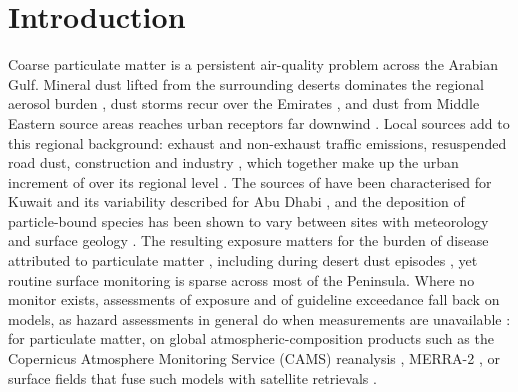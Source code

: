 \section{Introduction}
\label{sec:intro}

Coarse particulate matter is a persistent air-quality problem across the Arabian Gulf. Mineral
dust lifted from the surrounding deserts dominates the regional aerosol burden
\citep{gandham2020,shahid2026}, dust storms recur over the Emirates
\citep{barbulescu2020,karagulian2019}, and dust from Middle Eastern source areas reaches urban
receptors far downwind \citep{givehchi2013}. Local sources add to this regional background:
exhaust and non-exhaust traffic emissions, resuspended road dust, construction and industry
\citep{thorpe2008,amato2009,harrison2021}, which together make up the urban increment of
\pmten{} over its regional level \citep{lenschow2001}. The sources of \pmten{} have been
characterised for Kuwait \citep{hopke2026} and its variability described for Abu Dhabi
\citep{abuelgasim2020}, and the deposition of particle-bound species has been shown to vary
between sites with meteorology and surface geology \citep{bae2025be7}. The resulting exposure
matters for the burden of disease attributed to particulate matter
\citep{cohen2017,lelieveled2015,chen2020,orellano2020}, including during desert dust episodes
\citep{karanasiou2012}, yet routine surface monitoring is sparse across most of the Peninsula.
Where no monitor exists, assessments of exposure and of guideline exceedance fall back on models,
as hazard assessments in general do when measurements are unavailable \citep{shin2026resilient}:
for particulate matter, on global atmospheric-composition products such as the Copernicus
Atmosphere Monitoring Service (CAMS) reanalysis \citep{inness2019,flemming2015,morcrette2009},
MERRA-2 \citep{gelaro2017,randles2017}, or surface fields that fuse such models with satellite
retrievals \citep{van_donkelaar2016,hammer2020}.

